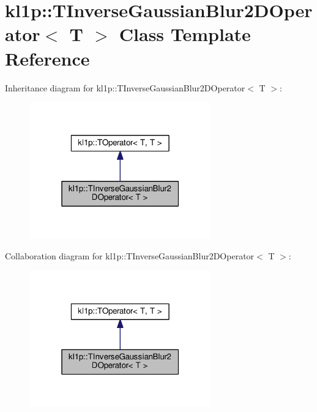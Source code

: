 \hypertarget{classkl1p_1_1TInverseGaussianBlur2DOperator}{}\section{kl1p\+:\+:T\+Inverse\+Gaussian\+Blur2\+D\+Operator$<$ T $>$ Class Template Reference}
\label{classkl1p_1_1TInverseGaussianBlur2DOperator}


Inheritance diagram for kl1p\+:\+:T\+Inverse\+Gaussian\+Blur2\+D\+Operator$<$ T $>$\+:
\nopagebreak
\begin{figure}[H]
\begin{center}
\leavevmode
\includegraphics[width=223pt]{classkl1p_1_1TInverseGaussianBlur2DOperator__inherit__graph}
\end{center}
\end{figure}


Collaboration diagram for kl1p\+:\+:T\+Inverse\+Gaussian\+Blur2\+D\+Operator$<$ T $>$\+:
\nopagebreak
\begin{figure}[H]
\begin{center}
\leavevmode
\includegraphics[width=223pt]{classkl1p_1_1TInverseGaussianBlur2DOperator__coll__graph}
\end{center}
\end{figure}
